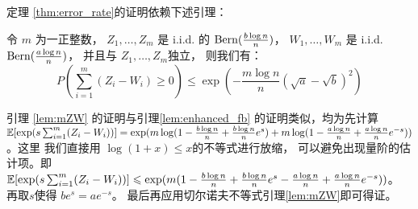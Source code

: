 定理 \ref{thm:error_rate}的证明依赖下述引理：
\begin{lemma}\label{lem:mZW}
	令 $m$ 为一正整数，
	$Z_1, \dots, Z_m$
  是 i.i.d. 的 $\operatorname{Bern}(\frac{b \log n}{n})$，
  $W_1, \dots, W_m$ 是 i.i.d. $\operatorname{Bern}(\frac{a \log n}{n})$，
  并且与 $Z_1, \dots, Z_m$独立，
	则我们有：
\begin{equation}
	P(\sum_{i=1}^m (Z_i  - W_i) \geq 0) \leq \exp(-\frac{m \log n}{n}(\sqrt{a} - \sqrt{b})^2)
	\end{equation}
\end{lemma}
引理 \ref{lem:mZW} 的证明与引理\ref{lem:enhanced_fb}
的证明类似，均为先计算
$\operatorname{\mathbb{E}}[\exp(s \sum_{i=1}^m (Z_i - W_i))]
=\exp(m \log(1-\frac{b \log n}{n} + \frac{b \log n}{n} e^s) + m \log(1-\frac{a \log n}{n} + \frac{a \log n}{n} e^{-s}))$。这里
我们直接用 $\log(1+x)\leq x$的不等式进行放缩，
可以避免出现量阶的估计项。即
$\operatorname{\mathbb{E}}[\exp(s \sum_{i=1}^m (Z_i - W_i))]
\leqslant \exp(m(1-\frac{b \log n}{n} + \frac{b \log n}{n} e^s - \frac{a \log n}{n} + \frac{a \log n}{n} e^{-s}))$。
再取$s$使得 $be^s=ae^{-s}$。
最后再应用切尔诺夫不等式引理\ref{lem:mZW}即可得证。

